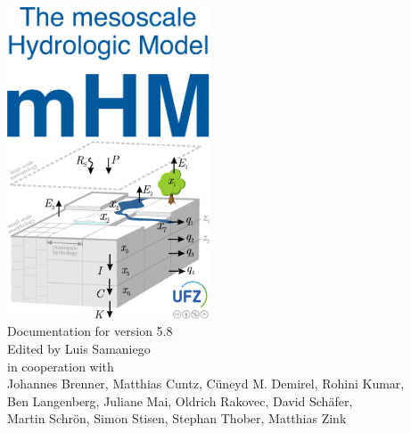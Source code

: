\documentclass[twoside]{book}
\newcommand{\+}{\discretionary{\mbox{\scriptsize$\hookleftarrow$}}{}{}}
\begin{document}

\hypersetup{pageanchor=false,
             bookmarks=true,
             bookmarksnumbered=true,
             pdfencoding=unicode
            }
\begin{titlepage}
\vspace*{1.5cm}
\begin{center}%
\includegraphics[width=6.0cm]{figures/mHM_textlogo.pdf}\\

\vspace*{1cm}
\includegraphics[width=6.0cm]{figures/mhm5-logo.pdf}\\
\vspace*{1.5cm}
{\Large Documentation for version 5.8}\\
\vspace*{2.5cm}
{\large Edited by Luis Samaniego}\\
\vspace*{0.5cm}
{\large in cooperation with}\\
\vspace*{0.5cm}
{\large 
Johannes Brenner,
Matthias Cuntz,
C\"uneyd M. Demirel,
Rohini Kumar,\\[1ex]
Ben Langenberg, 
Juliane Mai, 
Oldrich Rakovec, 
David Sch\"{a}fer,\\[1.2ex]
Martin Schr\"{o}n,
Simon Stisen,
Stephan Thober,
Matthias Zink }\\
\vspace*{1.9cm}
\vspace*{0.75cm}
\end{center}
\end{titlepage}
\end{document}

